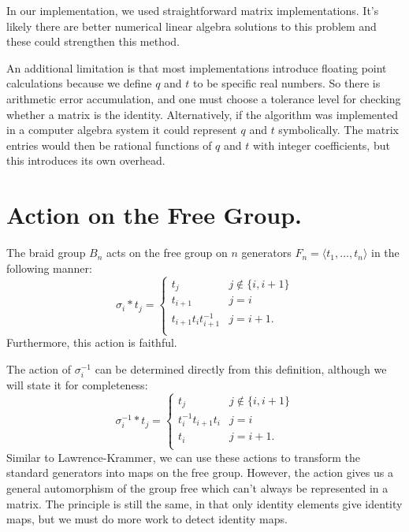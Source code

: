 \documentclass[12pt]{thesis}
\begin{document}
In our implementation, we used straightforward matrix implementations.
It's likely there are better numerical linear algebra solutions
to this problem and these could strengthen this method.

An additional limitation is that most implementations introduce floating point
calculations because we define $q$ and $t$ to be specific real 
numbers. 
So there is arithmetic error accumulation, and one must choose
a tolerance level for checking whether a matrix is the identity.
Alternatively, if the algorithm was implemented in a computer algebra system
it could represent $q$ and $t$ symbolically.
The matrix entries would then be rational functions of $q$ and $t$ with integer
coefficients, but this introduces its own overhead.

\section{Action on the Free Group.}

\begin{proposition}
\cite{action-on-free-group}
The braid group $B_{n}$ acts on the free group
on $n$ generators $F_{n} = \langle t_{1}, \ldots, t_{n} \rangle$ in the following manner:
\[
    \sigma_{i} * t_{j} =
    \begin{cases}
        t_{j} & j \not\in \{ i, i + 1 \} \\
        t_{i+1} & j = i \\
        t_{i + 1}t_{i}t_{i + 1}^{-1} & j = i + 1. \\
    \end{cases}
\]
    Furthermore, this action is faithful. 
\end{proposition}

The action of $\sigma_{i}^{-1}$ can be determined directly from this definition,
although we will state it for completeness:
\[
    \sigma_{i}^{-1} * t_{j} =
    \begin{cases}
        t_{j} & j \not\in \{ i, i + 1 \} \\
        t_{i}^{-1}t_{i+1}t_{i} & j = i \\
        t_{i} & j = i + 1. \\
    \end{cases}
\]
Similar to Lawrence-Krammer, we can use these actions
to transform the standard generators into maps on the free group.
However, the action
gives us a general automorphism of the group free which can't always be represented in a matrix.
The principle is still the same, in that only identity
elements give identity maps,
but we must do more work to detect identity maps.
\end{document}
